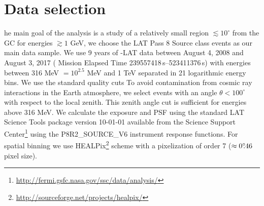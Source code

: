 \section{Data selection}

he main goal of the analysis is a study of a relatively small region $\lesssim 10^\circ$ from the GC for energies $\gtrsim 1$ GeV,
we choose the \Fermi LAT Pass 8 Source class events as our main data sample.
We use 9 years of {\Fermi}-LAT data between August 4, 2008  and August 3, 2017 ({\Fermi} Mission Elapsed Time 239557418\,s--523411376\,s)
with energies between 316 MeV $ = 10^{2.5}$ MeV
and 1 TeV separated in 21 logarithmic energy bins.
We use the standard quality cuts 
To avoid contamination from cosmic ray interactions in the Earth atmosphere, 
we select events with an angle $\theta < 100^{\circ}$ with respect to the local zenith.
This zenith angle cut is sufficient for energies above 316 MeV.
We calculate the exposure and PSF using the standard {\Fermi} LAT Science Tools package version 
10-01-01 available from the {\Fermi} Science Support Center\footnote{\url{http://fermi.gsfc.nasa.gov/ssc/data/analysis/}} 
using the P8R2\_SOURCE\_V6 instrument response functions.
For spatial binning we use HEALPix\footnote{\url{http://sourceforge.net/projects/healpix/}} \citep{2005ApJ...622..759G} scheme with a pixelization of order 7  ($\approx 0^\circ\!\!.46$ pixel size). 
